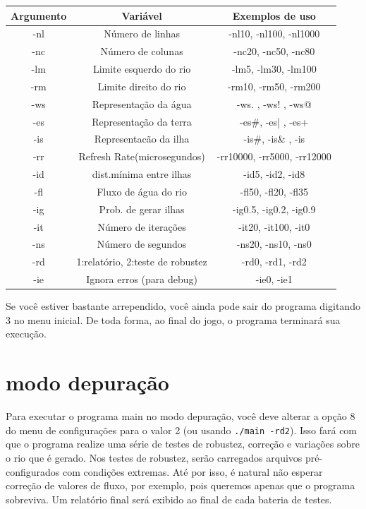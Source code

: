 \documentclass[11pt,a4paper]{article}
\begin{document}
\begin{center}

\begin{tabular}{|c|c|c|}
\hline 
Argumento & Variável & Exemplos de uso \\ 
\hline 
-nl & Número de linhas & -nl10, -nl100, -nl1000 \\ 
\hline 
-nc & Número de colunas & -nc20, -nc50, -nc80 \\ 
\hline 
-lm & Limite esquerdo do rio & -lm5, -lm30, -lm100 \\ 
\hline 
-rm & Limite direito do rio & -rm10, -rm50, -rm200 \\ 
\hline 
-ws & Representação da água & -ws. , -ws! , -ws@ \\ 
\hline 
-es & Representação da terra & -es\#, -es| , -es+ \\ 
\hline 
-is & Representacão da ilha & -is\#, -is\& , -is\* \\ 
\hline 
-rr & Refresh Rate(microsegundos) & -rr10000, -rr5000, -rr12000 \\ 
\hline 
-id & dist.mínima entre ilhas & -id5, -id2, -id8 \\ 
\hline 
-fl & Fluxo de água do rio & -fl50, -fl20, -fl35 \\ 
\hline 
-ig & Prob. de gerar ilhas & -ig0.5, -ig0.2, -ig0.9 \\ 
\hline 
-it & Número de iterações & -it20, -it100, -it0 \\ 
\hline 
-ns & Número de segundos & -ns20, -ns10, -ns0 \\ 
\hline 
-rd & 1:relatório, 2:teste de robustez & -rd0, -rd1, -rd2 \\ 
\hline 
-ie & Ignora erros (para debug) & -ie0, -ie1 \\ 
\hline 
\end{tabular} 
\end{center}

Se você estiver bastante arrependido, você ainda pode sair do programa digitando 3 no menu inicial. De toda forma, ao final do jogo, o programa terminará sua execução.

\section{modo depuração}
Para executar o programa main no modo depuração, você deve alterar a opção 8 do menu de configurações para o valor 2 (ou usando \verb|./main -rd2|). Isso fará com que o programa realize uma série de testes de robustez, correção e variações sobre o rio que é gerado. Nos testes de robustez, serão carregados arquivos pré-configurados com condições extremas. Até por isso, é natural não esperar correção de valores de fluxo, por exemplo, pois queremos apenas que o programa sobreviva. Um relatório final será exibido ao final de cada bateria de testes. \\
\end{document}
